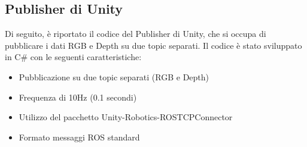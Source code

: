 \documentclass[11pt]{report}
\begin{document}
\subsection{Publisher di Unity}
Di seguito, è riportato il codice del Publisher di Unity, che si occupa di pubblicare i dati RGB e Depth su due topic separati. Il codice è stato sviluppato in C\# con le seguenti caratteristiche:
\begin{itemize}
\item Pubblicazione su due topic separati (RGB e Depth)
\item Frequenza di 10Hz (0.1 secondi)
\item Utilizzo del pacchetto Unity-Robotics-ROSTCPConnector
\item Formato messaggi ROS standard
\end{itemize}
\vspace{-1em} %
\end{document}
